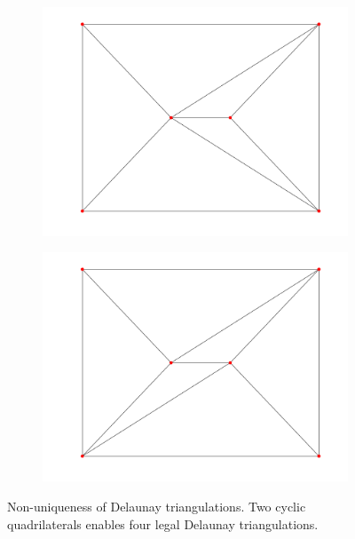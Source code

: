 \begin{figure}[ht]
\begin{subfigure}[b]{0.2\textwidth}
        \centering
        \includegraphics[width=\textwidth]{report/Images/Theory/triangulation/triangulation_delaunay2.png}
        \label{fig:triangulation-delaunay2}
    \end{subfigure}
    \hfill
    \begin{subfigure}[b]{0.2\textwidth}
        \centering
        \includegraphics[width=\textwidth]{report/Images/Theory/triangulation/triangulation_delaunay4.png}
        \label{fig:triangulation-delaunay4}
    \end{subfigure}
    \caption[Non-uniqueness of Delaunay triangulations]{Non-uniqueness of Delaunay triangulations. Two cyclic quadrilaterals enables four legal Delaunay triangulations.}
    \label{fig:non-unique-delaunay}
\end{figure}



